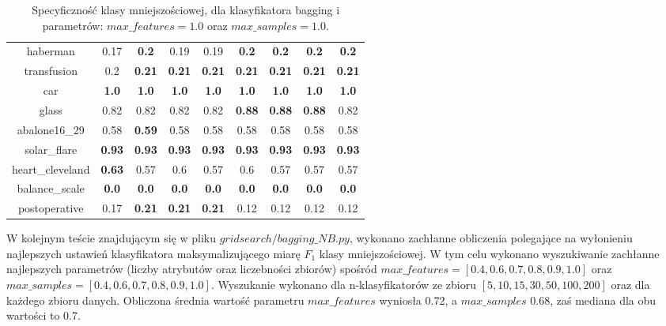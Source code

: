 \begin{table}[H]
\begin{center}
{\begin{tabular}{c|cccccccc}
					haberman&0.17&\textbf{0.2}&0.19&0.19&\textbf{0.2}&\textbf{0.2}&\textbf{0.2}&\textbf{0.2}\\%
					
					transfusion&0.2&\textbf{0.21}&\textbf{0.21}&\textbf{0.21}&\textbf{0.21}&\textbf{0.21}&\textbf{0.21}&\textbf{0.21}\\%
					
					car&\textbf{1.0}&\textbf{1.0}&\textbf{1.0}&\textbf{1.0}&\textbf{1.0}&\textbf{1.0}&\textbf{1.0}&\textbf{1.0}\\%
					
					glass&0.82&0.82&0.82&0.82&\textbf{0.88}&\textbf{0.88}&\textbf{0.88}&0.82\\%
					
					abalone16\_29&0.58&\textbf{0.59}&0.58&0.58&0.58&0.58&0.58&0.58\\%
					
					solar\_flare&\textbf{0.93}&\textbf{0.93}&\textbf{0.93}&\textbf{0.93}&\textbf{0.93}&\textbf{0.93}&\textbf{0.93}&\textbf{0.93}\\%
					
					heart\_cleveland&\textbf{0.63}&0.57&0.6&0.57&0.6&0.57&0.57&0.57\\%
					
					balance\_scale&\textbf{0.0}&\textbf{0.0}&\textbf{0.0}&\textbf{0.0}&\textbf{0.0}&\textbf{0.0}&\textbf{0.0}&\textbf{0.0}\\%
					
					postoperative&0.17&\textbf{0.21}&\textbf{0.21}&\textbf{0.21}&0.12&0.12&0.12&0.12\\%
					
				\end{tabular}}
				\caption{Specyficzność klasy mniejszościowej, dla klasyfikatora bagging i parametrów: $max\_features = 1.0$ oraz $max\_samples = 1.0$.}
				\label{bagging-specyficznosc11}
			\end{center}
		\end{table}
\par
W kolejnym teście znajdującym się w pliku $gridsearch/bagging\_NB.py$, wykonano zachłanne obliczenia polegające na wyłonieniu najlepszych ustawień klasyfikatora maksymalizującego miarę $F_1$ klasy mniejszościowej. W tym celu wykonano wyszukiwanie zachłanne najlepszych parametrów (liczby atrybutów oraz liczebności zbiorów) spośród $max\_features=[0.4, 0.6, 0.7, 0.8, 0.9, 1.0]$ oraz $max\_samples=[0.4, 0.6, 0.7, 0.8, 0.9, 1.0]$. Wyszukanie wykonano dla n-klasyfikatorów ze zbioru $[5, 10, 15, 30, 50, 100, 200]$ oraz dla każdego zbioru danych. Obliczona średnia wartość parametru $max\_features$ wyniosła 0.72, a $max\_samples$ 0.68, zaś mediana dla obu wartości to 0.7. \par

